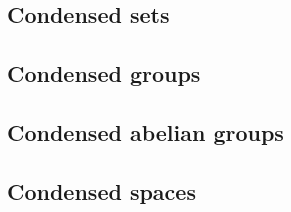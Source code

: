 \documentclass[envcountsame,envcountsect]{svmono}
\begin{document}



\begin{partbacktext}
	\part{Condensed sets}%
	\label{prt:condensed_sets}

	\noindent 
\end{partbacktext}


\begin{partbacktext}
	\part{Condensed groups}%
	\label{prt:condensed_groups}

	\noindent 
\end{partbacktext}


\begin{partbacktext}
	\part{Condensed abelian groups}%
	\label{prt:condensed_abelian_groups}

	\noindent 
\end{partbacktext}


\begin{partbacktext}
	\part{Condensed spaces}%
	\label{prt:condensed_spaces}

	\noindent 
\end{partbacktext}

\end{document}
